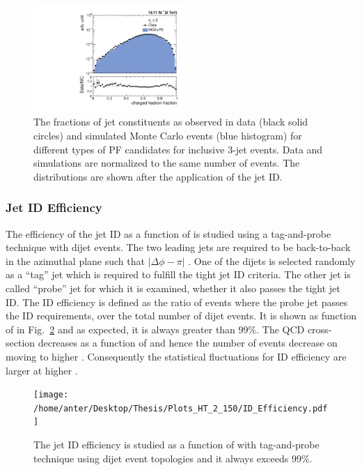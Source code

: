 \begin{figure}[!htbp]
\begin{center}
 \vspace*{1mm}
 \includegraphics[width=0.51\textwidth]{Plots_HT_2_150/Comparison_ChHadFrac_3_HT_2_150.pdf}
 \caption[The fractions of jet constituents for different types of PF candidates for inclusive 3-jet events.]{The fractions of jet constituents as observed in data (black solid circles) and simulated Monte Carlo events (blue histogram) for different types of PF candidates for inclusive 3-jet events. Data and simulations are normalized to the same number of events. The distributions are shown after the application of the jet ID.}
 \label{fig:qual3}
 \end{center}
\end{figure} 

\subsubsection{Jet ID Efficiency}
The efficiency of the jet ID as a function of \httwo is studied using a tag-and-probe technique with dijet events. The two leading jets are required to be back-to-back in the azimuthal plane such that $|\Delta\phi - \pi|$ . One of the dijets is selected randomly as a ``tag'' jet which is required to fulfill the tight jet ID criteria. The other jet is called ``probe'' jet for which it is examined, whether it also passes the tight jet ID. The ID efficiency is defined as the ratio of events where the probe jet passes the ID requirements, over the total number of dijet events. It is shown as function of \httwo in Fig.~\ref{fig:ideff} and as expected, it is always greater than 99\%. The QCD cross-section decreases as a function of \httwo and hence the number of events decrease on moving to higher \httwons. Consequently the statistical fluctuations for ID efficiency are larger at higher \httwons.

\begin{figure}[!htbp]
 \begin{center}
 \texttt{[image: /home/anter/Desktop/Thesis/Plots\_HT\_2\_150/ID\_Efficiency.pdf]}
 \caption[The jet ID efficiency is studied as a function of \httwo.]{The jet ID efficiency is studied as a function of \httwo with tag-and-probe technique using dijet event topologies and it always exceeds 99\%.}
 \label{fig:ideff}
 \end{center}
\end{figure} 

